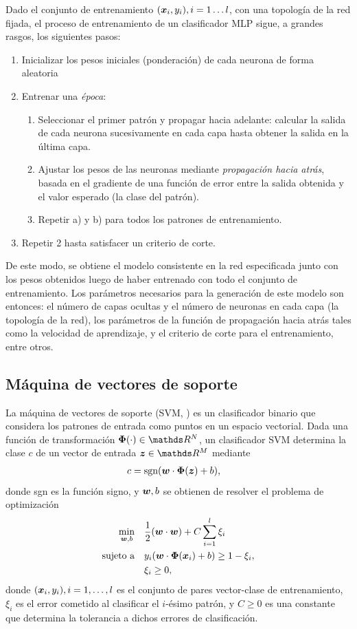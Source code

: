 \documentclass[12pt,bibliography=oldstyle,DIV=12,parskip=half-]{scrreprt}
\begin{document}
Dado el conjunto de entrenamiento $(\boldsymbol{x}_i, y_i), i=1\ldots l$, con
una topología de la red fijada, el proceso de entrenamiento de un
clasificador MLP sigue, a grandes rasgos, los siguientes pasos:
\begin{enumerate}
\item Inicializar los pesos iniciales (ponderación) de cada neurona de
  forma aleatoria
\item Entrenar una \emph{época}:
  \begin{enumerate}
  \item Seleccionar el primer patrón y propagar hacia adelante: calcular
    la salida de cada neurona sucesivamente en cada capa hasta obtener
    la salida en la última capa.
  \item Ajustar los pesos de las neuronas mediante \emph{propagación hacia
    atrás}, basada en el gradiente de una función de error entre la salida
    obtenida y el valor esperado (la clase del patrón).
  \item Repetir a) y b) para todos los patrones de entrenamiento.
  \end{enumerate}
  \item Repetir 2 hasta satisfacer un criterio de corte.
\end{enumerate}
De este modo, se obtiene el modelo consistente en la red especificada
junto con los pesos obtenidos luego de haber entrenado con todo el
conjunto de entrenamiento. Los parámetros necesarios para la
generación de este modelo son entonces: el número de capas ocultas y
el número de neuronas en cada capa (la topología de la red), los
parámetros de la función de propagación hacia atrás tales como
la velocidad de aprendizaje, y el criterio de corte para
el entrenamiento, entre otros.
%
%
\subsection{Máquina de vectores de soporte}
%
La máquina de vectores de soporte (SVM, )
\cite{svm} es un clasificador binario que considera los patrones de
entrada como puntos en un espacio vectorial. Dada una función de transformación
$\BPhi(\cdot)\in{}\RR^N$, un clasificador SVM determina la clase $c$ de
un vector de entrada $\zz\in\RR^M$ mediante
\begin{align}
  c &= \textrm{sgn}{\left(\boldsymbol{w}\cdot\boldsymbol{\Phi}(\boldsymbol{z})+b\right)},
\end{align}
donde sgn es la función signo, y $\boldsymbol{w},b$ se obtienen de resolver el
problema de optimización
\begin{align}
  \min_{\boldsymbol{w},b} &\quad
  \frac{1}{2}(\boldsymbol{w}\cdot\boldsymbol{w})+C\sum_{i=1}^{l}\xi_i\\
  \textrm{sujeto a} &\quad
  y_i(\boldsymbol{w}\cdot\boldsymbol{\Phi}(\boldsymbol{x}_i)+b)\geq 1-\xi_i,\\
  &\quad\xi_i\geq 0,
\end{align}
donde $(\boldsymbol{x}_i,y_i), i=1,\ldots,l$ es el conjunto de pares
vector-clase de entrenamiento, $\xi_i$ es el error cometido al
clasificar el $i$-ésimo patrón, y $C\geq0$ es una constante que
determina la tolerancia a dichos errores de clasificación.
\end{document}

